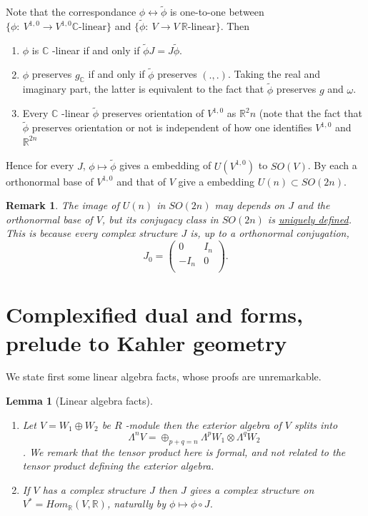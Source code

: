 \documentclass[11pt]{article}
\newtheorem{remark}{Remark}
\newtheorem{lemma}[theorem]{Lemma}
\begin{document}
Note that the correspondance \(\phi \leftrightarrow \tilde\phi\) is one-to-one between \(\{\phi:\
V^{1,0}\longrightarrow V^{1,0} \mathbb{C}\text{-linear}\}\) and \(\{\tilde\phi:\ V\longrightarrow V\
\mathbb{R}\text{-linear}\}\). Then
\begin{enumerate}
\item \(\phi\) is \(\mathbb{C}\) -linear if and only if \(\tilde\phi J = J\tilde\phi\).
\item \(\phi\) preserves \(g_{\mathbb{C}}\) if and only if \(\tilde\phi\) preserves \((.,.)\). Taking the real
and imaginary part, the latter is equivalent to the fact that \(\tilde\phi\) preserves \(g\) and
\(\omega\).
\item Every \(\mathbb{C}\) -linear \(\tilde \phi\) preserves orientation of \(V^{1,0}\) as \(\mathbb{R}^2n\)
(note that the fact that \(\tilde\phi\) preserves orientation or not is independent of how one
identifies \(V^{1,0}\) and \(\mathbb{R}^{2n}\)
\end{enumerate}
Hence for every \(J\), \(\phi\mapsto\tilde\phi\) gives a embedding of \(U(V^{1,0})\) to \(SO(V)\). By each
a orthonormal base of \(V^{1,0}\) and that of \(V\) give a embedding \(U(n)\subset SO(2n)\).

\begin{remark}
The image of \(U(n)\) in \(SO(2n)\) may depends on \(J\) and the orthonormal base of \(V\), but its
conjugacy class in \(SO(2n)\) is \uline{uniquely defined}. This is because every complex structure \(J\) is,
up to a orthonormal conjugation, 
\[
J_0 = \begin{pmatrix}
0 & I_n \\
-I_n & 0 \\
\end{pmatrix}.
\]
\end{remark}


\section*{Complexified dual and forms, prelude to Kahler geometry}
\label{sec:org8d0d23b}

We state first some linear algebra facts, whose proofs are unremarkable.

\begin{lemma}[Linear algebra facts]
\label{lem:alg-exterior}
\label{org63ecde9}
\begin{enumerate}
\item Let \(V = W_1 \oplus W_2\) be \(R\) -module then the exterior algebra of \(V\) splits into \[\Lambda^nV
   = \oplus_{p+q = n}\Lambda^p W_1 \otimes \Lambda^q W_2 \]. We remark that the tensor product here
is formal, and not related to the tensor product defining the exterior algebra.
\item If \(V\) has a complex structure \(J\) then \(J\) gives a complex structure on \(V^* =
   Hom_{\mathbb{R}}(V, \mathbb{R})\), naturally by \(\phi\mapsto \phi\circ J\).
\end{enumerate}
\end{lemma}
\end{document}
